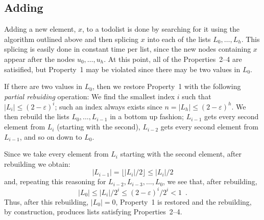 \documentclass[lotsofwhite]{patmorin}
\newcommand{\eps}{\varepsilon}
\begin{document}
\vspace{1ex}
\begin{algorithmic}
    \ENDIF
  \ENDFOR
\end{algorithmic}

\subsection{Adding}

Adding a new element, $x$, to a todolist is done by searching for it
using the algorithm outlined above and then splicing $x$ into each of
the lists $L_0,\ldots,L_h$.  This splicing is easily done in constant
time per list, since the new nodes containing $x$ appear after the nodes
$u_0,\ldots,u_h$.  At this point, all of the Properties~2--4 are satisified,
but Property~1 may be violated since there may be two values in $L_0$.

If there are two values in $L_0$, then we restore Property~1 with the
following \emph{partial rebuiding} operation: We find the smallest index
$i$ such that $|L_i|\le (2-\eps)^i$; such an index always exists since
$n=|L_h|\le(2-\eps)^h$.  We then rebuild the lists $L_{0},\ldots,L_{i-1}$
in a bottom up fashion; $L_{i-1}$ gets every second element from $L_i$
(starting with the second), $L_{i-2}$ gets every second element from
$L_{i-1}$, and so on down to $L_0$.

Since we take every element from $L_i$ starting with the second element,
after rebuilding we obtain:
\[
   |L_{i-1}| = \lfloor |L_i|/2 \rfloor \le |L_i|/2
\]
and, repeating this reasoning for $L_{i-2}, L_{i-3},\ldots, L_0$, we see that, after rebuilding,
\[
   |L_{0}| \le |L_i|/2^i \le (2-\eps)^i/2^i < 1 \enspace .
\]
Thus, after this rebuilding, $|L_0|=0$, Property~1 is restored and the
rebuilding, by construction, produces lists satisfying Properties~2--4.
\end{document}
